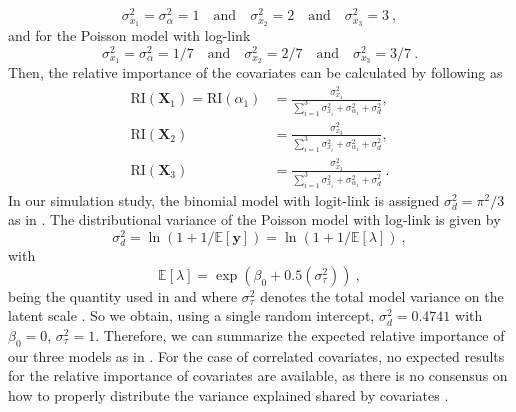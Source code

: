 \begin{equation}
    \sigma_{x_1}^2 = \sigma_{\alpha}^2  = 1 \quad \text{and} \quad \sigma_{x_2}^2 = 2 \quad \text{and} \quad \sigma_{x_3}^2 = 3 \ ,
\end{equation}
and for the Poisson model with log-link
\begin{equation}
    \sigma_{x_1}^2 = \sigma_{\alpha}^2  = 1/7 \quad \text{and} \quad \sigma_{x_2}^2 = 2/7 \quad \text{and} \quad \sigma_{x_3}^2 = 3/7 \ .
\end{equation}
Then, the relative importance of the covariates can be calculated by following  as
\begin{equation}
    \begin{aligned}
        \text{RI}(\mathbf{X}_{1})  = \text{RI}(\alpha_1)  &= \frac{\sigma_{x_1}^2}{\sum_{i=1}^{3}\sigma_{x_i}^2 +\sigma_{\alpha_1}^2  + \sigma_d^2}, \\
        \text{RI}(\mathbf{X}_2) &= \frac{\sigma_{x_3}^2}{\sum_{i=1}^{3}\sigma_{x_i}^2 +\sigma_{\alpha_1}^2 +  \sigma_d^2}, \\
        \text{RI}(\mathbf{X}_3) &= \frac{\sigma_{x_3}^2}{\sum_{i=1}^{3}\sigma_{x_i}^2 +\sigma_{\alpha_1}^2 +  \sigma_d^2} \ .
    \end{aligned}
\end{equation}
In our simulation study, the binomial model with logit-link is assigned $\sigma^2_d=\pi^2/3$ as in . The distributional variance of the Poisson model with log-link is given by 
\begin{equation}
    \sigma_d^2 = \ln (1 + 1/\mathbb{E}[\mathbf{y}]) = \ln (1 + 1/\mathbb{E}[\lambda]) \ ,
\end{equation}
with
\begin{equation}
    \label{eq:lambda}
    \mathbb{E}[\lambda]=\exp\left(\beta_0 + 0.5 (\sigma^2_{\tau})\right) \ ,
\end{equation}
being the quantity used in  and where $\sigma^2_{\tau}$ denotes the total model variance on the latent scale \citep{nakagawa2017}. So we obtain, using a single random intercept, $\sigma_{d}^2=0.4741$ with $\beta_0=0$, $\sigma^2_{\tau}=1$. Therefore, we can summarize the expected relative importance of our three models as in . For the case of correlated covariates, no expected results for the relative importance of covariates are available, as there is no consensus on how to properly distribute the variance explained shared by covariates \citep{gromping_relaimpo}.
